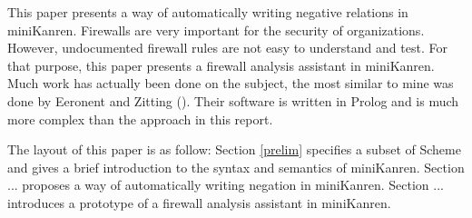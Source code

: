 \ifthesis This paper presents a way of automatically writing negative relations in miniKanren.
\else Firewalls are very important for the security of organizations. However, undocumented firewall rules are not easy to understand and test. For that purpose, this paper presents a firewall analysis assistant in miniKanren. Much work has actually been done on the subject, the most similar to mine was done by Eeronent and Zitting (\cite{Eronen2001AnES}). Their software is written in Prolog and is much more complex than the approach in this report.\fi

The layout of this paper is as follow: Section \ref{prelim} specifies a subset of Scheme and gives a brief introduction to the syntax and semantics of miniKanren.
\ifthesis Section ... proposes a way of automatically writing negation in miniKanren.
\else Section ... introduces a prototype of a firewall analysis assistant in miniKanren.\fi